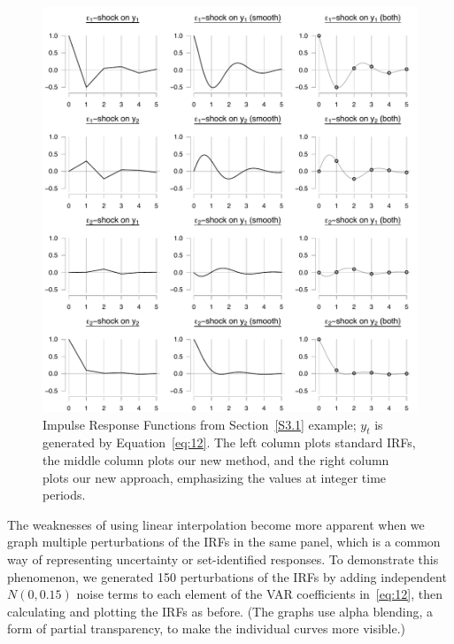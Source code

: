 \documentclass[12pt,fleqn]{article}
\begin{document}
\begin{figure}[t]
  \centering
  \includegraphics[width=6.5in]{graphs/numeric.pdf}
  \caption{Impulse Response Functions from Section~\ref{S3.1} example;
    $y_t$ is generated by Equation~\eqref{eq:12}. The left column
    plots standard IRFs, the middle column plots our new method, and
    the right column plots our new approach, emphasizing the values at
    integer time periods.}
  \label{fig:3}
\end{figure}

The weaknesses of using linear interpolation become more apparent when
we graph multiple perturbations of the IRFs in the same panel, which
is a common way of representing uncertainty or set-identified
responses. To demonstrate this phenomenon, we generated 150
perturbations of the IRFs by adding independent $N(0, 0.15)$ noise
terms to each element of the VAR coefficients in~\eqref{eq:12}, then
calculating and plotting the IRFs as before. (The graphs use alpha
blending, a form of partial transparency, to make the individual
curves more visible.)
\end{document}
